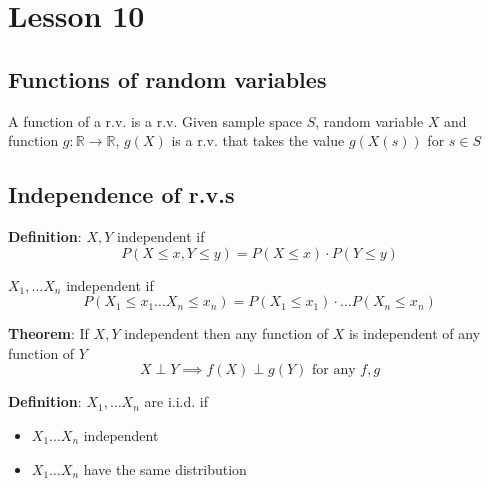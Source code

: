 \chapter{Lesson 10}

\section{Functions of random variables}

A function of a r.v. is a r.v. Given sample space $S$, random variable $X$ and function $g : \mathbb{R} \rightarrow \mathbb{R}$, $g(X)$ is a r.v. that takes the value $g(X(s))$ for $s \in S$

\section{Independence of r.v.s}

\begin{framed}
   \textbf{Definition}: $X, Y$ independent if
   \[
     P(X \leq x, Y \leq y) = P(X \leq x) \cdot P(Y \leq y)
   \] 

    $X_1, \hdots X_n$ independent if
    \[
      P(X_1 \leq x_1 \hdots X_n \leq x_n) = P(X_1 \leq x_1) \cdot \hdots P(X_n \leq x_n)
    \] 
\end{framed}

\begin{framed}
   \textbf{Theorem}: If $X, Y$ independent then any function of $X$ is independent of any function of $Y$ 
   \[
     X \perp Y \implies f(X) \perp g(Y) \text{ for any }f, g
   \] 
\end{framed}

\begin{framed}
   \textbf{Definition}: $X_1, \hdots X_n$ are i.i.d. if 
   \begin{itemize}
      \item $X_1 \hdots X_n$ independent
      \item $X_1 \hdots X_n$ have the same distribution
   \end{itemize}
\end{framed}

